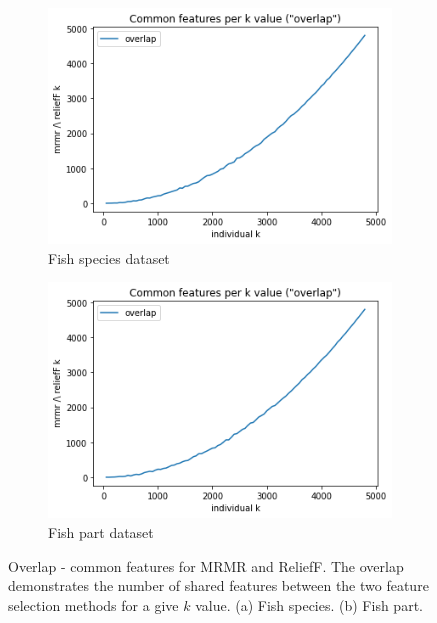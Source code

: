 \documentclass[runningheads]{llncs}
\begin{document}
\begin{figure}[htb]
  \centering
  \begin{subfigure}[b]{\linewidth}
    \includegraphics[width=1\linewidth]{fish_k_overlap.png}
    \caption{Fish species dataset}
    \label{fig:fish-k-overlap}
  \end{subfigure}

  \begin{subfigure}[b]{\linewidth}
    \includegraphics[width=1\linewidth]{part_k_overlap.png}
    \caption{Fish part dataset}
    \label{fig:part-k-overlap}
  \end{subfigure}
  \caption[Two numerical solutions]{
    Overlap - common features for MRMR and ReliefF.
    The overlap demonstrates the number of shared features between the two feature selection methods for a give $k$ value.
    (a) Fish species. (b) Fish part.}
  \label{fig:fs-overlap}
\end{figure}
\end{document}
